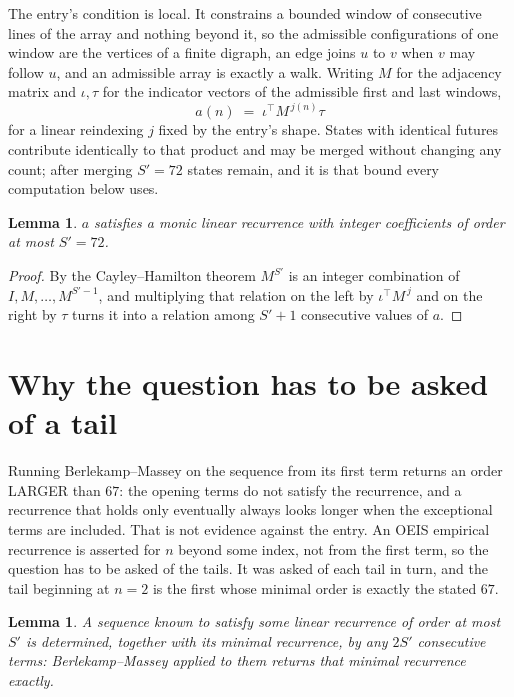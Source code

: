 \documentclass[11pt,a4paper]{article}
\theoremstyle{plain}
\newtheorem{lemma}[theorem]{Lemma}
\theoremstyle{definition}
\begin{document}
The entry's condition is local. It constrains a bounded window of consecutive lines of the
array and nothing beyond it, so the admissible configurations of one window are the vertices of
a finite digraph, an edge joins $u$ to $v$ when $v$ may follow $u$, and an admissible array is
exactly a walk. Writing $M$ for the adjacency matrix and $\iota,\tau$ for the indicator vectors
of the admissible first and last windows,
\[
a(n)\;=\;\iota^{\!\top}M^{\,j(n)}\tau
\]
for a linear reindexing $j$ fixed by the entry's shape. States with identical futures
contribute identically to that product and may be merged without changing any count; after
merging $S'=72$ states remain, and it is that bound every computation below uses.

\begin{lemma}\label{lem:cf}
$a$ satisfies a monic linear recurrence with integer coefficients of order at most $S'=72$.
\end{lemma}

\begin{proof}
By the Cayley--Hamilton theorem $M^{S'}$ is an integer combination of $I,M,\dots,M^{S'-1}$,
and multiplying that relation on the left by $\iota^{\!\top}M^{\,j}$ and on the right by
$\tau$ turns it into a relation among $S'+1$ consecutive values of $a$.
\end{proof}

\section{Why the question has to be asked of a tail}

Running Berlekamp--Massey on the sequence from its first term returns an order LARGER than $67$: the opening terms do not satisfy the recurrence, and a recurrence that holds only eventually always looks longer when the exceptional terms are included. That is not evidence against the entry. An OEIS empirical recurrence is asserted for $n$ beyond some index, not from the first term, so the question has to be asked of the tails. It was asked of each tail in turn, and the tail beginning at $n=2$ is the first whose minimal order is exactly the stated $67$.

\begin{lemma}\label{lem:bm}
A sequence known to satisfy some linear recurrence of order at most $S'$ is determined,
together with its minimal recurrence, by any $2S'$ consecutive terms: Berlekamp--Massey applied
to them returns that minimal recurrence exactly.
\end{lemma}
\end{document}
